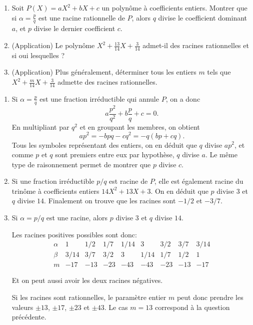 \begin{exo}
\begin{enumerate}
\item 
Soit $P(X)=aX^2+bX+c$ un polynôme à coefficients entiers. Montrer que si $\alpha = \frac{p}{q}$ est une racine rationnelle de $P$, alors $q$ divise le coefficient dominant $a$, et $p$ divise le dernier coefficient $c$.
\item  (Application) Le polynôme $X^2+\frac{13}{14}X+\frac{3}{14}$ admet-il des racines rationnelles et si oui lesquelles ?
\item (Application) Plus généralement, déterminer tous les entiers $m$ tels que $X^2+\frac{m}{14}X+\frac{3}{14}$ admette des racines rationnelles.
\end{enumerate}
\begin{sol}
\begin{enumerate}
\item 
Si $\alpha=\frac{p}{q}$ est une fraction irréductible qui annule $P$, on a donc 
\[ a\frac{p^2}{q^2}+b\frac{p}{q}+c=0. \]
En multipliant par $q^2$ et en groupant les membres, on obtient
\[ ap^2=-bpq-cq^2=-q(bp+cq).\]
Tous les symboles représentant des entiers, on en déduit que  $q$ divise $ap^2$, et comme $p$ et $q$ sont premiers entre eux par hypothèse, $q$ divise $a$. Le même type de raisonnement permet de montrer que $p$ divise $c$.
\item Si une fraction irréductible $p/q$ est racine de $P$, elle est également racine du trinôme à coefficients entiers $14X^2+13X+3$. On en déduit que $p$ divise $3$ et $q$ divise $14$.
Finalement on trouve que les racines sont $-1/2$ et $-3/7$.
\item Si $\alpha = p/q$ est une racine, alors $p$ divise $3$ et $q$ divise $14$. 

Les racines positives possibles sont donc:
\[
\begin{array}{ccccccccc}
\alpha  & 1& 1/2 & 1/7 & 1/14 & 3 & 3/2 & 3/7 & 3/14 \\
\beta  & 3/14 & 3/7 & 3/2 & 3 & 1/14 & 1/7 & 1/2 & 1\\
m & -17 & -13 & -23 & -43 & -43 & -23 & -13 & -17
\end{array}
\]

Et on peut aussi avoir les deux racines négatives.


Si les racines sont rationnelles, le paramètre entier $m$ peut donc prendre les valeurs $\pm 13$, $\pm 17$, $\pm 23$ et $\pm 43$. Le cas $m=13$ correspond à la question précédente.

\end{enumerate}
\end{sol}
\end{exo}